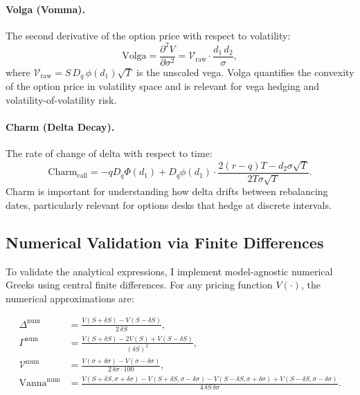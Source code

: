 \documentclass[11pt,a4paper]{article}
\begin{document}
\paragraph{Volga (Vomma).}
The second derivative of the option price with respect to volatility:
\begin{equation}\label{eq:volga}
    \text{Volga} = \frac{\partial^2 V}{\partial \sigma^2} = \mathcal{V}_{\text{raw}} \cdot \frac{d_1 \, d_2}{\sigma},
\end{equation}
where $\mathcal{V}_{\text{raw}} = S \, D_q \, \phi(d_1) \sqrt{T}$ is the unscaled vega. Volga quantifies the convexity of the option price in volatility space and is relevant for vega hedging and volatility-of-volatility risk.

\paragraph{Charm (Delta Decay).}
The rate of change of delta with respect to time:
\begin{equation}\label{eq:charm}
    \text{Charm}_{\text{call}} = -q D_q \Phi(d_1) + D_q \phi(d_1) \cdot \frac{2(r-q)T - d_2 \sigma \sqrt{T}}{2T \sigma \sqrt{T}}.
\end{equation}
Charm is important for understanding how delta drifts between rebalancing dates, particularly relevant for options desks that hedge at discrete intervals.


\subsection{Numerical Validation via Finite Differences}\label{subsec:numerical_greeks}

To validate the analytical expressions, I implement model-agnostic numerical Greeks using central finite differences. For any pricing function $V(\cdot)$, the numerical approximations are:

\begin{align}
    \Delta^{\text{num}} &= \frac{V(S + \delta S) - V(S - \delta S)}{2 \, \delta S}, \label{eq:num_delta} \\[4pt]
    \Gamma^{\text{num}} &= \frac{V(S + \delta S) - 2V(S) + V(S - \delta S)}{(\delta S)^2}, \label{eq:num_gamma} \\[4pt]
    \mathcal{V}^{\text{num}} &= \frac{V(\sigma + \delta\sigma) - V(\sigma - \delta\sigma)}{2 \, \delta\sigma \cdot 100}, \label{eq:num_vega} \\[4pt]
    \text{Vanna}^{\text{num}} &= \frac{V(S{+}\delta S, \sigma{+}\delta\sigma) - V(S{+}\delta S, \sigma{-}\delta\sigma) - V(S{-}\delta S, \sigma{+}\delta\sigma) + V(S{-}\delta S, \sigma{-}\delta\sigma)}{4 \, \delta S \, \delta\sigma}. \label{eq:num_vanna}
\end{align}
\end{document}
